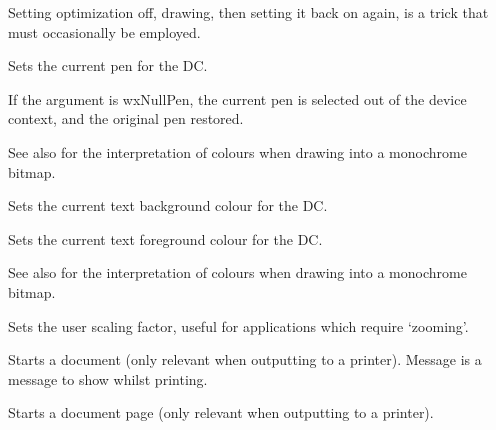 Setting optimization off, drawing, then setting it back on again, is a trick
that must occasionally be employed.

\label{wxdcsetpen}


Sets the current pen for the DC.

If the argument is wxNullPen, the current pen is selected out of the device
context, and the original pen restored.

See also  for the interpretation of colours
when drawing into a monochrome bitmap.

\label{wxdcsettextbackground}


Sets the current text background colour for the DC.

\label{wxdcsettextforeground}


Sets the current text foreground colour for the DC.

See also  for the interpretation of colours
when drawing into a monochrome bitmap.

\label{wxdcsetuserscale}


Sets the user scaling factor, useful for applications which require
`zooming'.

\label{wxdcstartdoc}


Starts a document (only relevant when outputting to a printer).
Message is a message to show whilst printing.

\label{wxdcstartpage}


Starts a document page (only relevant when outputting to a printer).

\section{}\label{wxdcclipper}

